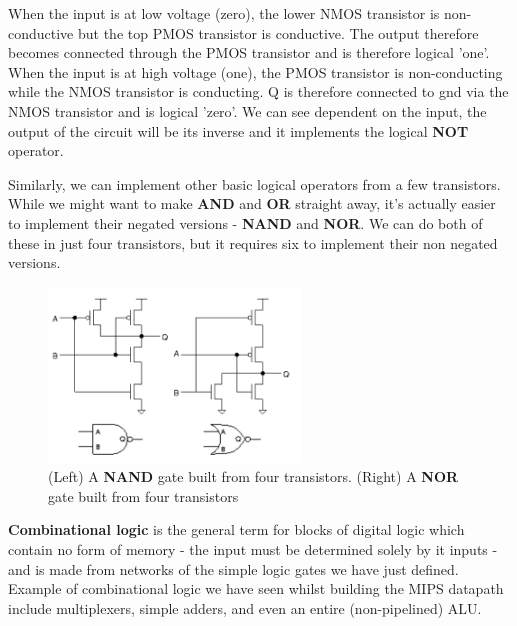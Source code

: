 \documentclass{article}
\begin{document}
	When the input is at low voltage (zero), the lower NMOS transistor is non-conductive but the top PMOS transistor is conductive. The output therefore becomes connected through the PMOS transistor and is therefore logical 'one'. When the input is at high voltage (one), the PMOS transistor is non-conducting while the NMOS transistor is conducting. Q is therefore connected to gnd via the NMOS transistor and is logical 'zero'. We can see dependent on the input, the output of the circuit will be its inverse and it implements the logical \textbf{NOT} operator.
	
	Similarly, we can implement other basic logical operators from a few transistors. While we might want to make \textbf{AND} and \textbf{OR} straight away, it's actually easier to implement their negated versions - \textbf{NAND} and \textbf{NOR}. We can do both of these in just four transistors, but it requires six to implement their non negated versions.
	
	\begin{figure}[ht]
		\centering
		\includegraphics[width=0.6\textwidth]{nand_nor_transistors}
		\caption{(Left) A \textbf{NAND} gate built from four transistors.  (Right) A \textbf{NOR} gate built from four transistors}
		\label{fig:nand_nor_transistors}
	\end{figure}
	
	\par 
	\textbf{Combinational logic} is the general term for blocks of digital logic which contain no form of memory - the input must be determined solely by it inputs - and is made from networks of the simple logic gates we have just defined. Example of combinational logic we have seen whilst building the MIPS datapath include multiplexers, simple adders, and even an entire (non-pipelined) ALU.
	
\end{document}
